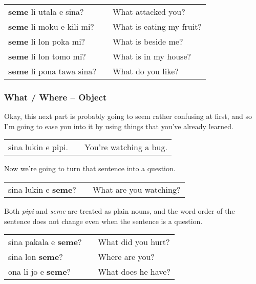 \begin{supertabular}{p{5,5cm}|ll}
\textbf{seme} li utala e sina? && What attacked you? \\
\textbf{seme} li moku e kili mi? && What is eating my fruit? \\
\textbf{seme} li lon poka mi? && What is beside me? \\
\textbf{seme} li lon tomo mi? && What is in my house? \\
\textbf{seme} li pona tawa sina? && What do you like? \\ 
\end{supertabular} 
%
\subsubsection*{What / Where -- Object}
%
Okay, this next part is probably going to seem rather confusing at first, and so I'm going to ease you into it by using things that you've already learned. 

\begin{supertabular}{p{5,5cm}|ll}
sina lukin e pipi. && You're watching a bug. \\
\end{supertabular} 

Now we're going to turn that sentence into a question. 

\begin{supertabular}{p{5,5cm}|ll}
sina lukin e \textbf{seme}? && What are you watching? \\
\end{supertabular} 

Both \textit{pipi} and \textit{seme} are treated as plain nouns, and the word order of the sentence does not change even when the sentence is a question. 

\begin{supertabular}{p{5,5cm}|ll}
sina pakala e \textbf{seme}? && What did you hurt? \\
sina lon \textbf{seme}? && Where are you? \\ 
ona li jo e \textbf{seme}? && What does he have? \\
\end{supertabular} 
%
